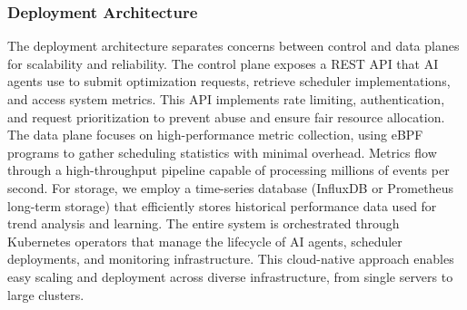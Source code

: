 \subsubsection{Deployment Architecture}
The deployment architecture separates concerns between control and data planes for scalability and reliability. The control plane exposes a REST API that AI agents use to submit optimization requests, retrieve scheduler implementations, and access system metrics. This API implements rate limiting, authentication, and request prioritization to prevent abuse and ensure fair resource allocation. The data plane focuses on high-performance metric collection, using eBPF programs to gather scheduling statistics with minimal overhead. Metrics flow through a high-throughput pipeline capable of processing millions of events per second. For storage, we employ a time-series database (InfluxDB or Prometheus long-term storage) that efficiently stores historical performance data used for trend analysis and learning. The entire system is orchestrated through Kubernetes operators that manage the lifecycle of AI agents, scheduler deployments, and monitoring infrastructure. This cloud-native approach enables easy scaling and deployment across diverse infrastructure, from single servers to large clusters.